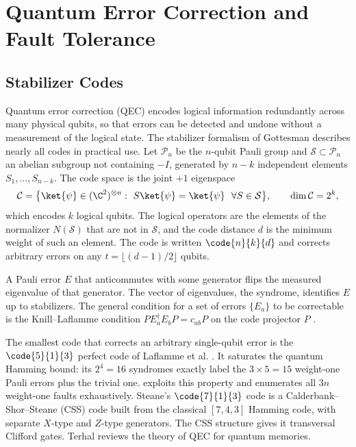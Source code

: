\section{Quantum Error Correction and Fault Tolerance}\label{sec:bg:qec}

\subsection{Stabilizer Codes}

Quantum error correction (QEC) encodes logical information redundantly across many physical qubits, so that errors can be detected and undone without a measurement of the logical state. The stabilizer formalism of Gottesman \cite{gottesman1997stabilizer} describes nearly all codes in practical use. Let $\mathcal{P}_n$ be the $n$-qubit Pauli group and $\mathcal{S}\subset\mathcal{P}_n$ an abelian subgroup not containing $-I$, generated by $n-k$ independent elements $S_1,\dots,S_{n-k}$. The code space is the joint $+1$ eigenspace
\begin{equation}\label{eq:bg:stabilizer}
\mathcal{C}=\bigl\{\ket{\psi}\in(\C^2)^{\otimes n}:\ S\ket{\psi}=\ket{\psi}\ \ \forall S\in\mathcal{S}\bigr\},\qquad \dim\mathcal{C}=2^{k},
\end{equation}
which encodes $k$ logical qubits. The logical operators are the elements of the normalizer $N(\mathcal{S})$ that are not in $\mathcal{S}$, and the code distance $d$ is the minimum weight of such an element. The code is written $\code{n}{k}{d}$ and corrects arbitrary errors on any $t=\lfloor(d-1)/2\rfloor$ qubits.

A Pauli error $E$ that anticommutes with some generator flips the measured eigenvalue of that generator. The vector of eigenvalues, the syndrome, identifies $E$ up to stabilizers. The general condition for a set of errors $\{E_a\}$ to be correctable is the Knill--Laflamme condition $PE_a^{\dagger}E_bP=c_{ab}P$ on the code projector $P$ \cite{knill1997theory}.

The smallest code that corrects an arbitrary single-qubit error is the $\code{5}{1}{3}$ perfect code of Laflamme et al. \cite{laflamme1996perfect}. It saturates the quantum Hamming bound: its $2^4=16$ syndromes exactly label the $3\times5=15$ weight-one Pauli errors plus the trivial one.  exploits this property and enumerates all $3n$ weight-one faults exhaustively. Steane's $\code{7}{1}{3}$ code \cite{steane1996codes} is a Calderbank--Shor--Steane (CSS) code \cite{calderbank1996goodcodes} built from the classical $[7,4,3]$ Hamming code, with separate $X$-type and $Z$-type generators. The CSS structure gives it transversal Clifford gates. Terhal \cite{terhal2015qecmemories} reviews the theory of QEC for quantum memories.

